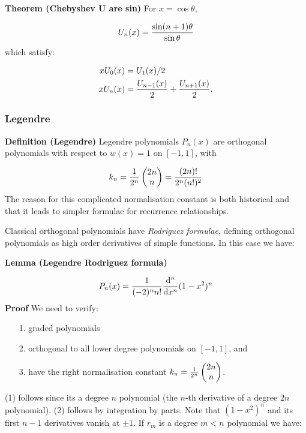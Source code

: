 \documentclass[12pt,a4paper]{article}
\begin{document}
\textbf{Theorem (Chebyshev U are sin)} For $x = \cos \ensuremath{\theta}$,

\[
U_n(x) = {\sin(n+1) \ensuremath{\theta} \over \sin \ensuremath{\theta}}
\]
which satisfy:


\begin{align*}
x U_0(x) &= U_1(x)/2 \\
x U_n(x) &= {U_{n-1}(x) \over 2} + {U_{n+1}(x) \over 2}.
\end{align*}
\subsubsection{Legendre}
\textbf{Definition (Legendre)} Legendre polynomials $P_n(x)$ are orthogonal polynomials with respect to $w(x) = 1$ on $[-1,1]$, with

\[
k_n = {1 \over 2^n} \begin{pmatrix} 2n \\ n \end{pmatrix} = 
{(2n)! \over 2^n (n!)^2}
\]
The reason for this complicated normalisation constant is both historical and that it leads to simpler formulae for recurrence relationships.

Classical orthogonal polynomials have \emph{Rodriguez formulae}, defining orthogonal polynomials as high order derivatives of simple functions. In this case we have:

\textbf{Lemma (Legendre Rodriguez formula)}

\[
P_n(x) = {1 \over (-2)^n n!}{{\rm d}^n \over {\rm d} x^n} (1-x^2)^n
\]
\textbf{Proof} We need to verify:

\begin{itemize}
\item[1. ] graded polynomials


\item[2. ] orthogonal to all lower degree polynomials on $[-1,1]$, and


\item[3. ] have the right normalisation constant $k_n = {1 \over 2^n} \begin{pmatrix} 2n \\ n \end{pmatrix}$.

\end{itemize}
(1) follows since its a degree $n$ polynomial (the $n$-th derivative of a degree $2n$ polynomial). (2) follows by integration by parts. Note that $(1-x^2)^n$ and its first $n-1$ derivatives vanish at $\ensuremath{\pm}1$. If $r_m$ is a degree $m < n$ polynomial we have:
\end{document}
